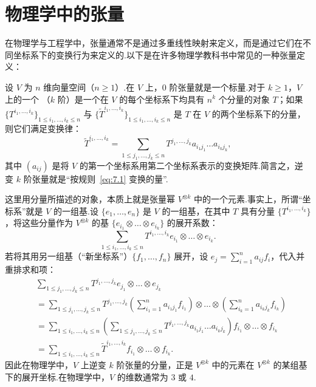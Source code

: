 \section{物理学中的张量}
\label{sec:physics}

在物理学与工程学中，张量通常不是通过多重线性映射来定义，而是通过它们在不同坐标系下的变换行为来定义的.以下是在许多物理学教科书中常见的一种张量定义：

设 $V$ 为 $n$ 维向量空间（$n \geq 1$）.在 $V$ 上，$0$ 阶张量就是一个标量.对于 $k \geq 1$，$V$ 上的一个 （$k$ 阶）是一个在 $V$ 的每个坐标系下均具有 $n^k$ 个分量的对象 $T$；如果 $\{T^{i_1, \dots, i_k}\}_{1 \leq i_1, \dots, i_k \leq n}$ 与 $\{\widetilde{T}^{i_1, \dots, i_k}\}_{1 \leq i_1, \dots, i_k \leq n}$ 是 $T$ 在 $V$ 的两个坐标系下的分量，则它们满足变换律：
\begin{equation}
  \widetilde{T}^{i_1, \dots, i_k} = \sum_{1 \leq j_1, \dots, j_k \leq n} T^{j_1, \dots, j_k} a_{i_1 j_1} \dots a_{i_k j_k}, \label{eq:7.1}
\end{equation}
其中 $(a_{ij})$ 是将 $V$ 的第一个坐标系用第二个坐标系表示的变换矩阵.简言之，逆变 $k$ 阶张量就是``按规则~\eqref{eq:7.1} 变换的量''.

这里用分量所描述的对象，本质上就是张量幂 $V^{\otimes k}$ 中的一个元素.事实上，所谓``坐标系''就是 $V$ 的一组基.设 $\{e_1, \dots, e_n\}$ 是 $V$ 的一组基，在其中 $T$ 具有分量 $\{T^{i_1, \dots, i_k}\}$，将这些分量作为 $V^{\otimes k}$ 的基 $\{e_{i_1} \otimes \dots \otimes e_{i_k}\}$ 的展开系数：
\[
  \sum_{1 \leq i_1, \dots, i_k \leq n} T^{i_1, \dots, i_k} e_{i_1} \otimes \dots \otimes e_{i_k}.
\]
若将其用另一组基（``新坐标系''）$\{f_1, \dots, f_n\}$ 展开，设 $e_j = \sum_{i=1}^n a_{ij} f_i$，代入并重排求和项：
\begin{align*}
  &\sum_{1 \leq j_1, \dots, j_k \leq n} T^{j_1, \dots, j_k} e_{j_1} \otimes \dots \otimes e_{j_k} \\
  &= \sum_{1 \leq j_1, \dots, j_k \leq n} T^{j_1, \dots, j_k} \left(\sum_{i_1=1}^n a_{i_1 j_1} f_{i_1}\right) \otimes \dots \otimes \left(\sum_{i_k=1}^n a_{i_k j_k} f_{i_k}\right) \\
  &= \sum_{1 \leq i_1, \dots, i_k \leq n} \left(\sum_{1 \leq j_1, \dots, j_k \leq n} T^{j_1, \dots, j_k} a_{i_1 j_1} \dots a_{i_k j_k}\right) f_{i_1} \otimes \dots \otimes f_{i_k} \\
  &= \sum_{1 \leq i_1, \dots, i_k \leq n} \widetilde{T}^{i_1, \dots, i_k} f_{i_1} \otimes \dots \otimes f_{i_k}.
\end{align*}
因此在物理学中，$V$ 上逆变 $k$ 阶张量的分量，正是 $V^{\otimes k}$ 中的元素在 $V^{\otimes k}$ 的某组基下的展开坐标.在物理学中，$V$ 的维数通常为 $3$ 或 $4$.

